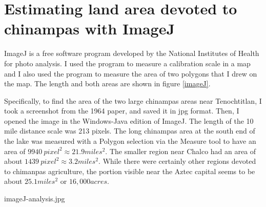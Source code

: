 \documentclass[onecolumn]{article}
\begin{document}
\clearpage
\newpage

\section{Estimating land area devoted to chinampas with ImageJ}
\label{appx_imageJ}

ImageJ is a free software program developed by the National Institutes of Health for photo analysis.\cite{imageJ}  I used the program to measure a calibration scale in a map and I also used the program to measure the area of two polygons that I drew on the map.  The length and both areas are shown in figure \ref{imageJ}.

Specifically, to find the area of the two large chinampas areas near Tenochtitlan, I took a screenshot from the 1964 paper,\cite{Chinampas_1964} and saved it in jpg format.  Then, I opened the image in the Windows-Java edition of ImageJ.\cite{imageJ}  The length of the 10 mile distance scale was 213 pixels. The long chinampas area at the south end of the lake was measured with a Polygon selection via the Measure tool to have an area of $9940~pixel^2\approx21.9miles^2$.  The smaller region near Chalco had an area of about $1439~pixel^2\approx3.2miles^2$.  While there were certainly other regions devoted to chimanpas agriculture, the portion visible near the Aztec capital seems to be about $25.1miles^2$ or $16,000acres$.  

imageJ-analysis.jpg
\end{document}
